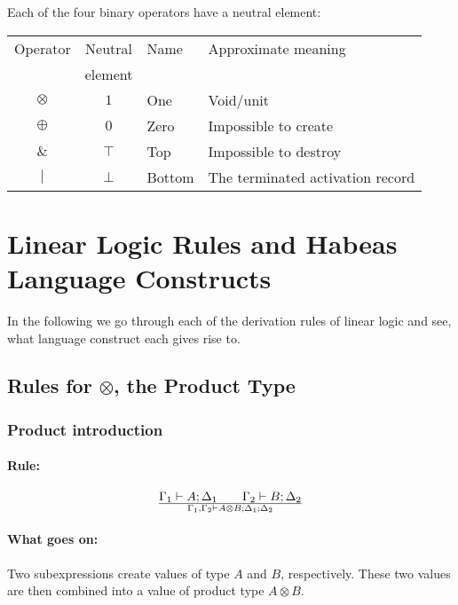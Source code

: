 \documentclass[a4paper]{article}
\begin{document}
Each of the four binary operators have a neutral element:
\begin{center}
  \begin{tabular}{c|c|l|l}
    \hline
    \hline
    Operator & Neutral & Name & Approximate meaning\\
             & element &&\\
    \hline
    $\otimes$ & $1$    & One    & Void/unit\\
    $\oplus$  & $0$    & Zero   & Impossible to create\\
    $\&$      & $\top$ & Top    & Impossible to destroy\\
    $|$       & $\bot$ & Bottom & The terminated activation record\\
    \hline
  \end{tabular}
\end{center}


\section{Linear Logic Rules and Habeas Language Constructs}

In the following we go through each of the derivation rules of linear
logic and see, what language construct each gives rise to.


\subsection{Rules for $\otimes$, the Product Type}

\subsubsection{Product introduction}
\paragraph{Rule:}
$$
{
 {\Gamma_1 \vdash A;\Delta_1}
 \qquad
 {\Gamma_2 \vdash B;\Delta_2}
}\over{
 \Gamma_1, \Gamma_2 \vdash A \otimes B ; \Delta_1 ; \Delta_2
}
$$

\paragraph{What goes on:} Two subexpressions create values of type $A$
and $B$, respectively. These two values are then combined into a value
of product type $A \otimes B$.
\end{document}
